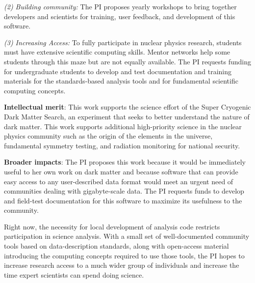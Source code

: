 {\it (2) Building community:} The PI proposes yearly workshops to bring together developers and scientists for training, user feedback, and development of this software.  %

{\it (3) Increasing Access:} To fully participate in nuclear physics research, students must have extensive scientific computing skills.
Mentor networks help some students through this maze but are not equally available.  The PI requests funding for undergraduate students to develop and test documentation and training materials for the standards-based analysis tools and for fundamental scientific computing concepts.

\textbf{Intellectual merit}: This work supports the science effort of the Super Cryogenic Dark Matter Search, an experiment that seeks to better understand the nature of dark matter.  This work supports additional high-priority science in the nuclear physics community such as the origin of the elements in the universe, fundamental symmetry testing, and radiation monitoring for national security.

\textbf{Broader impacts}: The PI proposes this work because it would be immediately useful to her own work on dark matter and because software that can provide easy access to any user-described data format would meet an urgent need of communities dealing with gigabyte-scale data.  The PI requests funds to develop and field-test documentation for this software to maximize its usefulness to the community. 


Right now, the necessity for local development of analysis code restricts participation in science analysis.  With a small set of well-documented community tools based on data-description standards, along with open-access material introducing the computing concepts required to use those tools, the PI hopes to increase research access to a much wider group of individuals and increase the time expert scientists can spend doing science.
